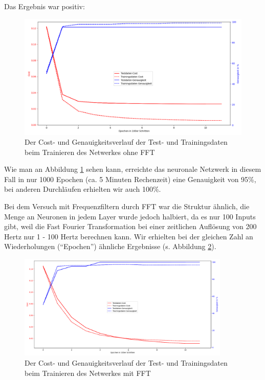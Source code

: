 \documentclass{scrartcl}
\begin{document}
	Das Ergebnis war positiv:

	\begin{figure}[h!]
		\includegraphics[width=\textwidth]{pictures/training-nofft.png}
		\caption{Der Cost- und Genauigkeitsverlauf der Test- und Trainingsdaten beim Trainieren des Netwerkes ohne FFT}
		\label{training-nofft}
	\end{figure}

	Wie man an Abbildung \ref{training-nofft} sehen kann, erreichte das neuronale Netzwerk in diesem Fall in nur 1000 Epochen (ca. 5 Minuten Rechenzeit) eine Genauigkeit von 95\%, bei anderen Durchläufen erhielten wir auch 100\%.

	Bei dem Versuch mit Frequenzfiltern durch FFT war die Struktur ähnlich, die Menge an Neuronen in jedem Layer wurde jedoch halbiert, da es nur 100 Inputs gibt, weil die Fast Fourier Transformation bei einer zeitlichen Auflösung von 200 Hertz nur 1 - 100 Hertz berechnen kann. Wir erhielten bei der gleichen Zahl an Wiederholungen (\enquote{Epochen}) ähnliche Ergebnisse (s. Abbildung \ref{training-fft}).

	\begin{figure}[h!]
		\includegraphics[width=0.9\textwidth]{pictures/training-fft2.png}
		\caption{Der Cost- und Genauigkeitsverlauf der Test- und Trainingsdaten beim Trainieren des Netwerkes mit FFT}
		\label{training-fft}
	\end{figure}
\end{document}
